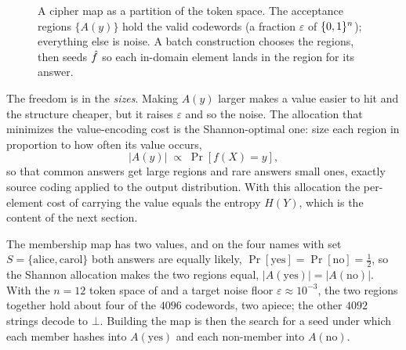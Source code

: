 \begin{figure}[t]
\centering
{}
\caption{A cipher map as a partition of the token space. The acceptance
regions $\{A(y)\}$ hold the valid codewords (a fraction $\varepsilon$ of
$\{0,1\}^n$); everything else is noise. A batch construction chooses the regions,
then seeds $\hat{f}$ so each in-domain element lands in the region for its
answer.}
\label{fig:acceptance}
\end{figure}

The freedom is in the \emph{sizes}. Making $A(y)$ larger makes a value
easier to hit and the structure cheaper, but it raises $\varepsilon$ and so
the noise. The allocation that minimizes the value-encoding cost is the
Shannon-optimal one: size each region in proportion to how often its value
occurs,
\[
  \lvert A(y)\rvert \;\propto\; \Pr[f(X) = y],
\]
so that common answers get large regions and rare answers small ones,
exactly source coding applied to the output distribution. With this
allocation the per-element cost of carrying the value equals the entropy
$H(Y)$, which is the content of the next section.

\begin{example}
\label{ex:acceptance-watchlist}
The membership map has two values, and on the four names with set
$S = \{\mathrm{alice}, \mathrm{carol}\}$ both answers are equally likely,
$\Pr[\text{yes}] = \Pr[\text{no}] = \tfrac12$, so the Shannon allocation
makes the two regions equal, $\lvert A(\mathrm{yes})\rvert =
\lvert A(\mathrm{no})\rvert$. With the $n = 12$ token space of
 and a target noise floor $\varepsilon \approx
10^{-3}$, the two regions together hold about four of the $4096$ codewords,
two apiece; the other $4092$ strings decode to $\bot$. Building the map is
then the search for a seed under which each member hashes into
$A(\mathrm{yes})$ and each non-member into $A(\mathrm{no})$.
\end{example}

